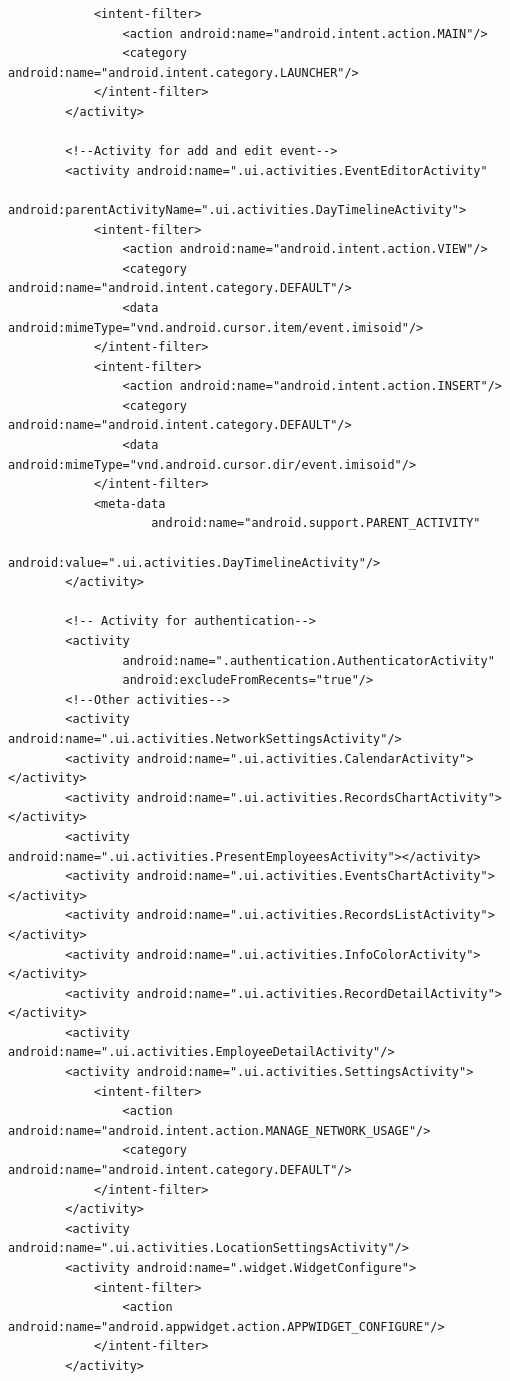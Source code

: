 \documentclass{diplomka}
\begin{document}
\begin{lstlisting}
            <intent-filter>
                <action android:name="android.intent.action.MAIN"/>
                <category android:name="android.intent.category.LAUNCHER"/>
            </intent-filter>
        </activity>

        <!--Activity for add and edit event-->
        <activity android:name=".ui.activities.EventEditorActivity"
                  android:parentActivityName=".ui.activities.DayTimelineActivity">
            <intent-filter>
                <action android:name="android.intent.action.VIEW"/>
                <category android:name="android.intent.category.DEFAULT"/>
                <data android:mimeType="vnd.android.cursor.item/event.imisoid"/>
            </intent-filter>
            <intent-filter>
                <action android:name="android.intent.action.INSERT"/>
                <category android:name="android.intent.category.DEFAULT"/>
                <data android:mimeType="vnd.android.cursor.dir/event.imisoid"/>
            </intent-filter>
            <meta-data
                    android:name="android.support.PARENT_ACTIVITY"
                    android:value=".ui.activities.DayTimelineActivity"/>
        </activity>

        <!-- Activity for authentication-->
        <activity
                android:name=".authentication.AuthenticatorActivity"
                android:excludeFromRecents="true"/>
        <!--Other activities-->
        <activity android:name=".ui.activities.NetworkSettingsActivity"/>
        <activity android:name=".ui.activities.CalendarActivity"></activity>
        <activity android:name=".ui.activities.RecordsChartActivity"></activity>
        <activity android:name=".ui.activities.PresentEmployeesActivity"></activity>
        <activity android:name=".ui.activities.EventsChartActivity"></activity>
        <activity android:name=".ui.activities.RecordsListActivity"></activity>
        <activity android:name=".ui.activities.InfoColorActivity"></activity>
        <activity android:name=".ui.activities.RecordDetailActivity"></activity>
        <activity android:name=".ui.activities.EmployeeDetailActivity"/>
        <activity android:name=".ui.activities.SettingsActivity">
            <intent-filter>
                <action android:name="android.intent.action.MANAGE_NETWORK_USAGE"/>
                <category android:name="android.intent.category.DEFAULT"/>
            </intent-filter>
        </activity>
        <activity android:name=".ui.activities.LocationSettingsActivity"/>
        <activity android:name=".widget.WidgetConfigure">
            <intent-filter>
                <action android:name="android.appwidget.action.APPWIDGET_CONFIGURE"/>
            </intent-filter>
        </activity>


\end{lstlisting}
\end{document}
